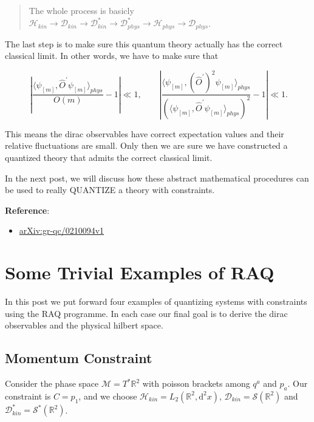 \documentclass{article}
\begin{document}
\begin{quote}
The whole process is basicly $\mathcal{H}_{kin}\to \mathcal{D}_{kin}\to \mathcal{D}^\ast_{kin} \to \mathcal{D}^\ast_{phys}\to \mathcal{H}_{phys}\to \mathcal{D}_{phys}$.
\end{quote}

The last step is to make sure this quantum theory actually has the correct classical limit. In other words, we have to make sure that

$$
\
\left|\frac{\langle\psi_{[m]},\hat{O}^\prime\psi_{[m]}\rangle_{phys}}{O(m)} - 1\right| \ll 1, \qquad \left|\frac{\langle\psi_{[m]},(\hat{O}^\prime)^2\psi_{[m]}\rangle_{phys}}{(\langle\psi_{[m]},\hat{O}^\prime\psi_{[m]}\rangle_{phys})^2} - 1\right| \ll 1.
$$

This means the dirac observables have correct expectation values and their relative fluctuations are small. Only then we are sure we have constructed a quantized theory that admits the correct classical limit.

In the next post, we will discuss how these abstract mathematical procedures can be used to really QUANTIZE a theory with constraints.

\textbf{Reference}:

\begin{itemize}
\item \href{https://arxiv.org/abs/gr-qc/0210094}{arXiv:gr-qc/0210094v1}
\end{itemize}



\section{Some Trivial Examples of RAQ}


In this post we put forward four examples of quantizing systems with constraints using the RAQ programme. In each case our final goal is to derive the dirac observables and the physical hilbert space.

\hrulefill

\subsection{Momentum Constraint}

Consider the phase space $\mathcal{M} = T^\ast \mathbb{R}^2$ with poisson brackets among $q^a$ and $p_a$. Our constraint is $C = p_1$, and we choose $\mathcal{H}_{kin} = L_2(\mathbb{R}^2, \mathrm{d}^2x)$, $\mathcal{D}_{kin} = \mathcal{S}(\mathbb{R}^2)$ and $\mathcal{D}^\ast_{kin} = \mathcal{S}^\ast(\mathbb{R}^2)$.
\end{document}
